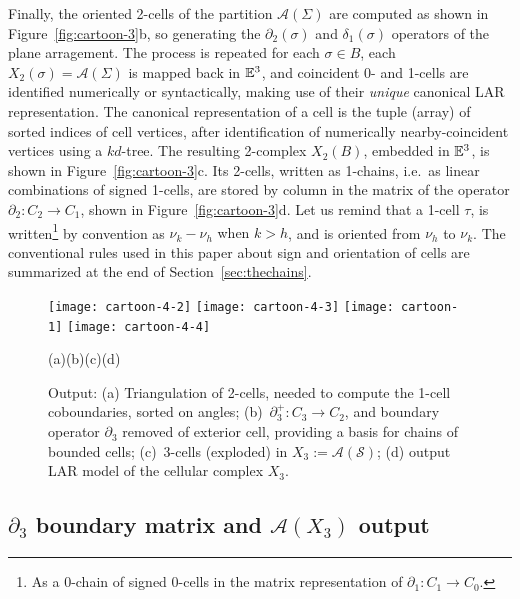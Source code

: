 Finally, the oriented 2-cells of the partition $\mathcal{A}(\Sigma)$ are computed  as shown in Figure~\ref{fig:cartoon-3}b, so generating the $\partial_2(\sigma)$ and $\delta_1(\sigma)$ operators of the plane arragement.
The process is repeated for each $\sigma\in B$, each $X_2(\sigma) = \mathcal{A}(\Sigma)$ is mapped back in $\mathbb{E}^3$, and coincident 0- and 1-cells are identified numerically or {syntactically}, making use of their \emph{unique} canonical LAR representation. {The canonical representation of a cell is the tuple (array)} of sorted indices of cell vertices, after identification of  numerically nearby-coincident vertices using a $kd$-tree.  The resulting 2-complex $X_2(B)$, embedded in $\mathbb{E}^3$, is shown in Figure~\ref{fig:cartoon-3}c. Its 2-cells, written as 1-chains, i.e.~as linear combinations of signed 1-cells, are stored by column in the matrix of the operator $\partial_2: C_2\to C_1$, shown in Figure~\ref{fig:cartoon-3}d. Let us remind that a 1-cell $\tau$, is written\footnote{As a 0-chain of signed 0-cells in the matrix representation of $\partial_1: C_1\to C_0$.} by convention as $\nu_k - \nu_h$ {when $k>h$},  and is oriented from $\nu_h$ to $\nu_k$.  {The conventional rules used in this paper about sign and orientation of cells are summarized at the end of Section~\ref{sec:thechains}.}


\begin{figure}[htb]
\texttt{[image: cartoon-4-2]}\hfill%
\texttt{[image: cartoon-4-3]}\hfill%
\texttt{[image: cartoon-1]}\hfill%
\texttt{[image: cartoon-4-4]}%

\vspace{-1.5mm}
{\footnotesize\hspace{.12\textwidth}(a)\hfill(b)\hfill(c)\hfill(d)\hspace{.12\textwidth}}
\vspace{-3.5mm}
   \caption{ Output: 
   (a) Triangulation of 2-cells, needed to compute the 1-cell coboundaries, sorted on angles; 
   (b)~$\partial^{+}_3: C_3\to C_2$, and boundary operator $\partial_3$ removed of exterior cell, providing a basis for chains of bounded cells; 
   (c)~3-cells (exploded) in $X_3 := \mathcal{A}(\mathcal{S})$; 
   (d) output LAR model of the cellular complex $X_3$. }
   \label{fig:cartoon-4}
\end{figure}


\subsection{$\partial_3$ boundary matrix and $\mathcal{A}(X_3)$ output}

